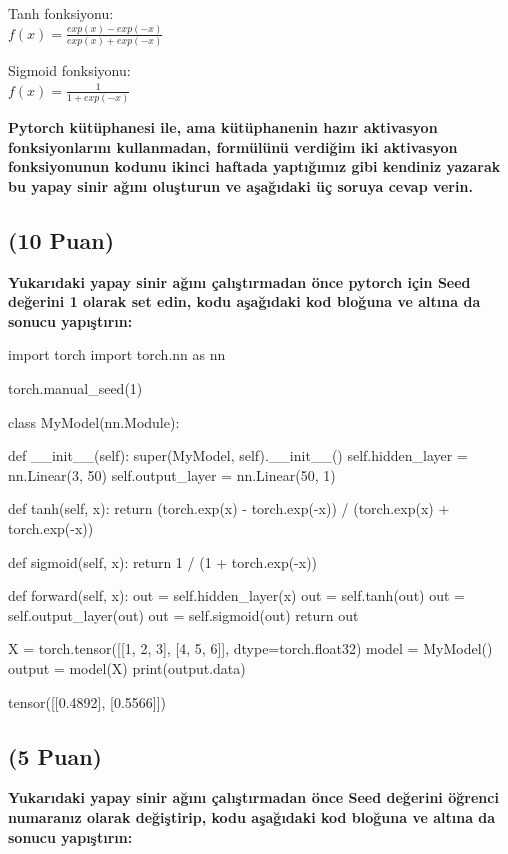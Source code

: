 \documentclass[11pt]{article}
\begin{document}
Tanh fonksiyonu:\\
$f(x) = \frac{exp(x) - exp(-x)}{exp(x) + exp(-x)}$
\vspace{.2in}

Sigmoid fonksiyonu:\\
$f(x) = \frac{1}{1 + exp(-x)}$

\vspace{.2in}
 \textbf{Pytorch kütüphanesi ile, ama kütüphanenin hazır aktivasyon fonksiyonlarını kullanmadan, formülünü verdiğim iki aktivasyon fonksiyonunun kodunu ikinci haftada yaptığımız gibi kendiniz yazarak bu yapay sinir ağını oluşturun ve aşağıdaki üç soruya cevap verin.}
 
\subsection{(10 Puan)} \textbf{Yukarıdaki yapay sinir ağını çalıştırmadan önce pytorch için Seed değerini 1 olarak set edin, kodu aşağıdaki kod bloğuna ve altına da sonucu yapıştırın:}

\begin{python}
import torch
import torch.nn as nn

torch.manual_seed(1)

class MyModel(nn.Module):

    def __init__(self):
        super(MyModel, self).__init__()
        self.hidden_layer = nn.Linear(3, 50)
        self.output_layer = nn.Linear(50, 1)

    def tanh(self, x):
        return (torch.exp(x) - torch.exp(-x)) / (torch.exp(x) + torch.exp(-x))

    def sigmoid(self, x):
        return 1 / (1 + torch.exp(-x))

    def forward(self, x):
        out = self.hidden_layer(x)
        out = self.tanh(out)
        out = self.output_layer(out)
        out = self.sigmoid(out)
        return out

X = torch.tensor([[1, 2, 3], [4, 5, 6]], dtype=torch.float32)
model = MyModel()
output = model(X)
print(output.data)
\end{python}

tensor([[0.4892],
        [0.5566]])

\subsection{(5 Puan)} \textbf{Yukarıdaki yapay sinir ağını çalıştırmadan önce Seed değerini öğrenci numaranız olarak değiştirip, kodu aşağıdaki kod bloğuna ve altına da sonucu yapıştırın:}
\end{document}
